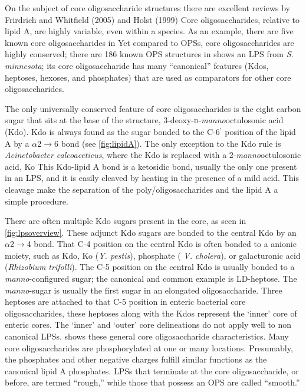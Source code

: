     On the subject of core oligosaccharide structures there are excellent reviews by Frirdrich and Whitfield (2005) and Holst
(1999) Core oligosaccharides, relative to lipid A, are highly variable, even within a species. As an example, there are five known core
oligosaccharides in \ecoli{} Yet compared to \acp{OPS}, core oligosaccharides are highly conserved; there are 186 known \ac{OPS} structures in
\ecoli{}  shows an \ac{LPS} from \textit{S. minnesota}; its core oligosaccharide has many ``canonical'' features (\eg Kdos, heptoses,
hexoses, and phosphates) that are used as comparators for other core oligosaccharides.

 The only universally conserved feature of core oligosaccharides is the eight carbon sugar that sits at the base of the structure, 3-deoxy-\textsc{d}-\textit{manno}octulosonic acid
(Kdo). Kdo is always found as the sugar bonded to the C-6$^\prime$ position of the lipid A by a $\alpha$2$\rightarrow$6 bond (see \cref{fig:lipidA}). The only exception to the Kdo
rule is \textit{Acinetobacter calcoaceticus}, where the Kdo is replaced with a 2-\textit{manno}octulosonic acid, Ko This Kdo-lipid A bond is a
ketosidic bond, usually the only one present in an \ac{LPS}, and it is easily cleaved by heating in the presence of a mild acid. This cleavage make the separation of the
poly/oligosaccharides and the lipid A a simple procedure.

There are often multiple Kdo sugars present in the core, as seen in \cref{fig:lpsoverview}. These adjunct Kdo sugars are bonded to the central Kdo by an $\alpha$2$\rightarrow$4
bond. That C-4 position on the central Kdo is often bonded to a anionic moiety, such as Kdo, Ko (\textit{Y. pestis}), phosphate ( \textit{V.
cholera}), or galacturonic acid (\textit{Rhizobium trifolli}). The C-5 position on the central Kdo is usually bonded to a
\textit{manno}-configured sugar; the canonical and common example is LD-heptose. The \textit{manno}-sugar is usually the first sugar in an elongated oligosaccharide. Three heptoses
are attached to that C-5 position in enteric bacterial core oligosaccharides, these heptoses along with the Kdos represent the `inner' core of enteric cores. The `inner' and
`outer' core delineations do not apply well to non canonical \acp{LPS}.  shows these general core oligosaccharide characteristics. Many core oligosaccharides
are phosphorylated at one or many locations. Presumably, the phosphates and other negative charges fulfill similar functions as the canonical lipid A phosphates. \Acp{LPS} that
terminate at the core oligosaccharide, or before, are termed ``rough,'' while those that possess an \ac{OPS} are called ``smooth.''

